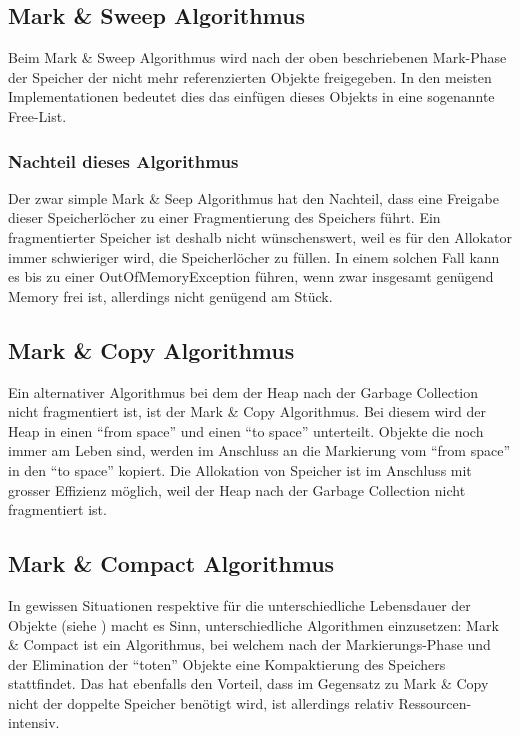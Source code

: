 \subsection{Mark \& Sweep Algorithmus\cite{langerkreft201005}}
Beim Mark \& Sweep Algorithmus wird nach der oben beschriebenen Mark-Phase der Speicher der nicht mehr referenzierten Objekte freigegeben. In den meisten Implementationen bedeutet dies das einfügen dieses Objekts in eine sogenannte Free-List.

\subsubsection{Nachteil dieses Algorithmus}
Der zwar simple Mark \& Seep Algorithmus hat den Nachteil, dass eine Freigabe dieser Speicherlöcher zu einer Fragmentierung des Speichers führt. Ein fragmentierter Speicher ist deshalb nicht wünschenswert, weil es für den Allokator immer schwieriger wird, die Speicherlöcher zu füllen. In einem solchen Fall kann es bis zu einer OutOfMemoryException führen, wenn zwar insgesamt genügend Memory frei ist, allerdings nicht genügend am Stück.

\subsection{Mark \& Copy Algorithmus\cite{langerkreft201005}}
Ein alternativer Algorithmus bei dem der Heap nach der Garbage Collection nicht fragmentiert ist, ist der Mark \& Copy Algorithmus. Bei diesem wird der Heap in einen ``from space'' und einen ``to space'' unterteilt. Objekte die noch immer am Leben sind, werden im Anschluss an die Markierung vom ``from space'' in den ``to space'' kopiert. Die Allokation von Speicher ist im Anschluss mit grosser Effizienz möglich, weil der Heap nach der Garbage Collection nicht fragmentiert ist.

\subsection{Mark \& Compact Algorithmus\cite{langerkreft201007}}
In gewissen Situationen respektive für die unterschiedliche Lebensdauer der Objekte (siehe ) macht es Sinn, unterschiedliche Algorithmen einzusetzen: Mark \& Compact ist ein Algorithmus, bei welchem nach der Markierungs-Phase und der Elimination der ``toten'' Objekte eine Kompaktierung des Speichers stattfindet. Das hat ebenfalls den Vorteil, dass im Gegensatz zu Mark \& Copy nicht der doppelte Speicher benötigt wird, ist allerdings relativ Ressourcen-intensiv.

